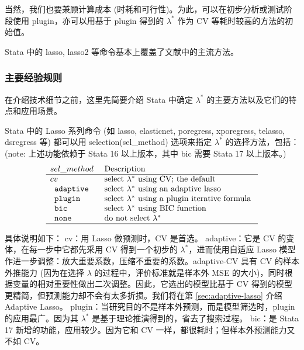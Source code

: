 当然，我们也要兼顾计算成本 (时耗和可行性)。为此，可以在初步分析或测试阶段使用 plugin，亦可以用基于 plugin 得到的 $\lambda^*$ 作为 CV 等耗时较高的方法的初始值。%

Stata 中的 lasso, lasso2 等命令基本上覆盖了文献中的主流方法。
\subsubsection{主要经验规则}


在介绍技术细节之前，这里先简要介绍 Stata 中确定 $\lambda^*$ 的主要方法以及它们的特点和应用场景。

Stata 中的 Lasso 系列命令 (如 lasso, elasticnet, poregress, xporegress, telasso, dsregress 等) 都可以用 selection(sel\_method) 选项来指定 $\lambda^*$ 的选择方法，包括： (note: 上述功能依赖于 Stata 16 以上版本，其中 bic 需要 Stata 17 以上版本。)
$$

\begin{array}{ll}
sel\_method  & \text { Description } \\
\hline  cv & \text { select $\lambda^*$ using CV; the default } \\
\texttt { adaptive } & \text { select $\lambda^*$ using an adaptive lasso } \\
\texttt { plugin} & \text { select $\lambda^*$ using a plugin iterative formula } \\
\texttt { bic} & \text { select $\lambda^*$ using BIC function } \\
\texttt { none } & \text { do not select $\lambda^*$ } \\
\hline 
\end{array}
$$


具体说明如下：
cv：用 Lasso 做预测时，CV 是首选。
adaptive：它是 $\mathrm{CV}$ 的变体，在每一步中它都先采用 CV 得到一个初步的 $\lambda^{*}$，进而使用自适应 Lasso 模型作进一步调整：放大重要系数，压缩不重要的系数。adaptive-CV 具有 CV 的样本外推能力 (因为在选择 $\lambda$ 的过程中，评价标准就是样本外 MSE 的大小)，同时根据变量的相对重要性做出二次调整。因此，它选出的模型比基于 CV 得到的模型更精简，但预测能力却不会有太多折损。我们将在第 \ref{sec:adaptive-lasso} 介绍 Adaptive Lasso。
plugin：当研究目的不是样本外预测，而是模型筛选时，plugin 的应用最广。因为其 $\lambda^*$ 是基于理论推演得到的，省去了搜索过程。
bic：是 Stata 17 新增的功能，应用较少。因为它和 CV 一样，都很耗时；但样本外预测能力又不如 CV。

